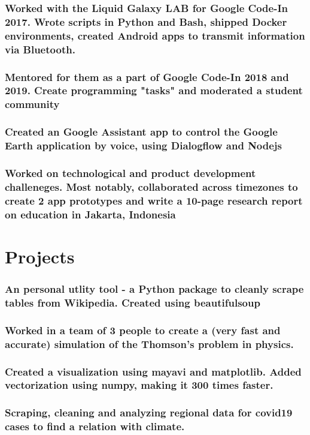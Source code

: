 \documentclass[a4paper]{resume}
\begin{document}
\subsubsection{Worked with the Liquid Galaxy LAB for Google Code-In 2017. Wrote scripts in Python and Bash, shipped Docker environments, created Android apps to transmit information via Bluetooth.}
\subsubsection{Mentored for them as a part of Google Code-In 2018 and 2019. Create programming "tasks" and moderated a student community}
\subsubsection{Created an Google Assistant app to control the Google Earth application by voice, using Dialogflow and Nodejs}

\subsubsection{Worked on technological and product development challeneges. Most notably, collaborated across timezones to create 2 app prototypes and write a 10-page research report on education in Jakarta, Indonesia}

\section{Projects}
\subsubsection{An personal utlity tool - a Python package to cleanly scrape tables from Wikipedia. Created using beautifulsoup}

\subsubsection{Worked in a team of 3 people to create a (very fast and accurate) simulation of the Thomson's problem in physics.}
\subsubsection{Created a visualization using mayavi and matplotlib. Added vectorization using numpy, making it 300 times faster.}

\subsubsection{Scraping, cleaning and analyzing regional data for covid19 cases to find a relation with climate.}
\end{document}
